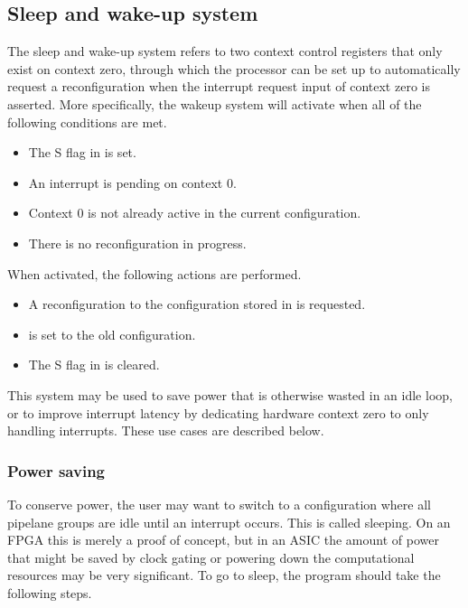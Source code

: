 \subsection{Sleep and wake-up system}
\label{sec:core-ug-reconf-saw}

The sleep and wake-up system refers to two context control registers that only 
exist on context zero, through which the processor can be set up to 
automatically request a reconfiguration when the interrupt request input of 
context zero is asserted. More specifically, the wakeup system will activate
when all of the following conditions are met.

\begin{itemize}
\item The S flag in  is set.
\item An interrupt is pending on context 0.
\item Context 0 is not already active in the current configuration.
\item There is no reconfiguration in progress.
\end{itemize}

\noindent When activated, the following actions are performed.

\begin{itemize}
\item A reconfiguration to the configuration stored in  is requested.
\item {} is set to the old configuration.
\item The S flag in  is cleared.
\end{itemize}

\noindent This system may be used to save power that is otherwise wasted in an 
idle loop, or to improve interrupt latency by dedicating hardware context zero 
to only handling interrupts. These use cases are described below.

\subsubsection{Power saving}
\label{sec:core-ug-reconf-saw-power}

To conserve power, the user may want to switch to a configuration where all 
pipelane groups are idle until an interrupt occurs. This is called sleeping. On 
an FPGA this is merely a proof of concept, but in an ASIC the amount of power 
that might be saved by clock gating or powering down the computational 
resources may be very significant. To go to sleep, the program should take the 
following steps.

